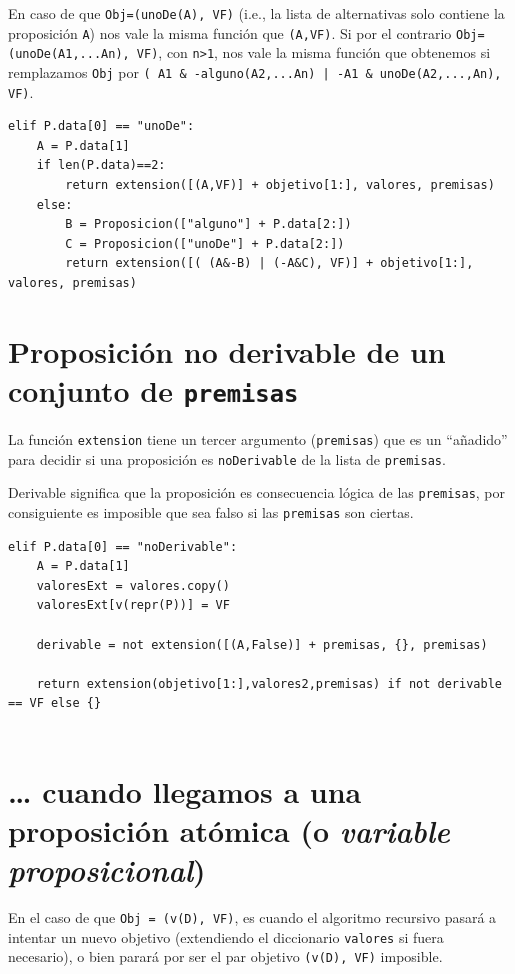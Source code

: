 \documentclass[10pt,a4paper]{report}
\begin{document}
\begin{enumerate}
En caso de que \texttt{Obj=(unoDe(A), VF)} (i.e., la lista de alternativas solo contiene la proposición \texttt{A}) nos vale la misma función que \texttt{(A,VF)}. 
Si por el contrario \texttt{Obj=(unoDe(A1,...An), VF)}, con \texttt{n>1}, nos vale la misma función que obtenemos si remplazamos \texttt{Obj} por \texttt{( A1 \& -alguno(A2,...An) | -A1 \& unoDe(A2,...,An), VF)}. 
\begin{verbatim}
elif P.data[0] == "unoDe":
    A = P.data[1]
    if len(P.data)==2:
        return extension([(A,VF)] + objetivo[1:], valores, premisas)
    else:
        B = Proposicion(["alguno"] + P.data[2:])
        C = Proposicion(["unoDe"] + P.data[2:])
        return extension([( (A&-B) | (-A&C), VF)] + objetivo[1:], valores, premisas)
\end{verbatim}
\end{enumerate}
\section{Proposición no derivable de un conjunto de \texttt{premisas}}
\label{sec:org03e2bc0}

La función \texttt{extension} tiene un tercer argumento (\texttt{premisas}) que es un ``añadido'' para decidir si una proposición es \texttt{noDerivable} de la lista de \texttt{premisas}.

Derivable significa que la proposición es consecuencia lógica de las \texttt{premisas}, por consiguiente es imposible que sea falso si las \texttt{premisas} son ciertas.

\begin{verbatim}
elif P.data[0] == "noDerivable":
    A = P.data[1]
    valoresExt = valores.copy() 
    valoresExt[v(repr(P))] = VF
                     
    derivable = not extension([(A,False)] + premisas, {}, premisas)
                     
    return extension(objetivo[1:],valores2,premisas) if not derivable == VF else {}
                     
\end{verbatim}
\section{\ldots{} cuando llegamos a una proposición atómica (o \emph{variable proposicional})}
\label{sec:org1a38cca}

En el caso de que \texttt{Obj = (v(D), VF)}, es cuando el algoritmo recursivo pasará a intentar un nuevo objetivo (extendiendo el diccionario \texttt{valores} si fuera necesario), o bien parará por ser el par objetivo \texttt{(v(D), VF)} imposible.
\end{document}
